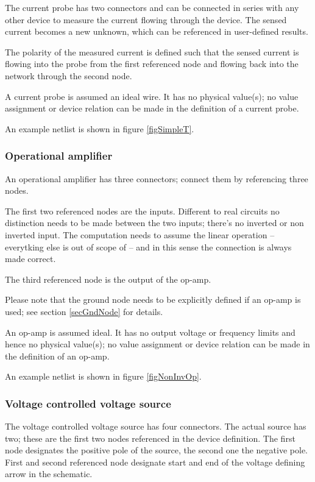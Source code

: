 The current probe  has two connectors and can be connected in
series with any other device to measure the current flowing through the
device. The sensed current becomes a new unknown, which can be
referenced in user-defined results.

The polarity of the measured current is defined such that the sensed
current is flowing into the probe from the first referenced node and
flowing back into the network through the second node.

A current probe is assumed an ideal wire. It has no physical value(s); no
value assignment or device relation can be made in the definition of a
current probe.

An example netlist is shown in figure \ref{figSimpleT}.


\subsubsection{Operational amplifier }

An operational amplifier  has three connectors; connect them by
referencing three nodes.

The first two referenced nodes are the inputs. Different to real
circuits no distinction needs to be made between the two inputs; there's
no inverted or non inverted input. The computation needs to assume the linear
operation -- everytking else is out of scope of \linnet{} -- and in this
sense the connection is always made correct.

The third referenced node is the output of the op-amp.

Please note that the ground node needs to be explicitly defined if an
op-amp is used; see section \ref{secGndNode} for details.

An op-amp is assumed ideal. It has no output voltage or frequency limits
and hence no physical value(s); no value assignment or device relation can
be made in the definition of an op-amp.

An example netlist is shown in figure \ref{figNonInvOp}.


\subsubsection{Voltage controlled voltage source }

The voltage controlled voltage source  has four connectors. The
actual source has two; these are the first two nodes referenced in the
device definition. The first node designates the positive pole of the
source, the second one the negative pole. First and second referenced
node designate start and end of the voltage defining arrow in the
schematic.

